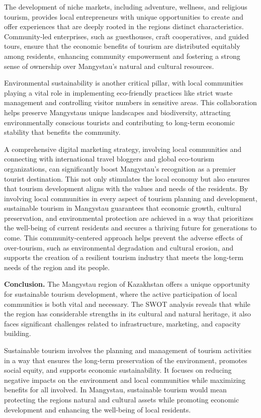 The development of niche markets, including adventure, wellness, and
religious tourism, provides local entrepreneurs with unique
opportunities to create and offer experiences that are deeply rooted in
the region\textquotesingle s distinct characteristics. Community-led
enterprises, such as guesthouses, craft cooperatives, and guided tours,
ensure that the economic benefits of tourism are distributed equitably
among residents, enhancing community empowerment and fostering a strong
sense of ownership over Mangystau's natural and cultural resources.

Environmental sustainability is another critical pillar, with local
communities playing a vital role in implementing eco-friendly practices
like strict waste management and controlling visitor numbers in
sensitive areas. This collaboration helps preserve
Mangystau\textquotesingle s unique landscapes and biodiversity,
attracting environmentally conscious tourists and contributing to
long-term economic stability that benefits the community.

A comprehensive digital marketing strategy, involving local communities
and connecting with international travel bloggers and global eco-tourism
organizations, can significantly boost Mangystau's recognition as a
premier tourist destination. This not only stimulates the local economy
but also ensures that tourism development aligns with the values and
needs of the residents. By involving local communities in every aspect
of tourism planning and development, sustainable tourism in Mangystau
guarantees that economic growth, cultural preservation, and
environmental protection are achieved in a way that prioritizes the
well-being of current residents and secures a thriving future for
generations to come. This community-centered approach helps prevent the
adverse effects of over-tourism, such as environmental degradation and
cultural erosion, and supports the creation of a resilient tourism
industry that meets the long-term needs of the region and its people.

{\bfseries Conclusion.} The Mangystau region of Kazakhstan offers a unique
opportunity for sustainable tourism development, where the active
participation of local communities is both vital and necessary. The SWOT
analysis reveals that while the region has considerable strengths in its
cultural and natural heritage, it also faces significant challenges
related to infrastructure, marketing, and capacity building.

Sustainable tourism involves the planning and management of tourism
activities in a way that ensures the long-term preservation of the
environment, promotes social equity, and supports economic
sustainability. It focuses on reducing negative impacts on the
environment and local communities while maximizing benefits for all
involved. In Mangystau, sustainable tourism would mean protecting the
region\textquotesingle s natural and cultural assets while promoting
economic development and enhancing the well-being of local residents.

